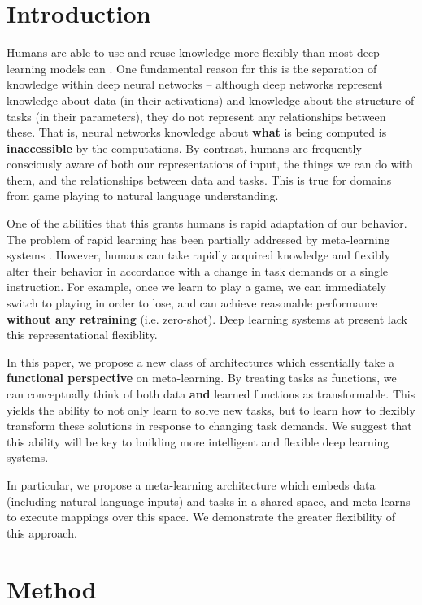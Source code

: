 \documentclass[11pt]{article}
\begin{document}
\section{Introduction}
Humans are able to use and reuse knowledge more flexibly than most deep learning models can \citep{Lake2017}. One fundamental reason for this is the separation of knowledge within deep neural networks -- although deep networks represent knowledge about data (in their activations) and knowledge about the structure of tasks (in their parameters), they do not represent any relationships between these. That is, neural networks knowledge about \textbf{what} is being computed is \textbf{inaccessible} by the computations. By contrast, humans are frequently consciously aware of both our representations of input, the things we can do with them, and the relationships between data and tasks. This is true for domains from game playing to natural language understanding. \par
One of the abilities that this grants humans is rapid adaptation of our behavior. The problem of rapid learning has been partially addressed by meta-learning systems \citep{}. However, humans can take rapidly acquired knowledge and flexibly alter their behavior in accordance with a change in task demands or a single instruction. For example, once we learn to play a game, we can immediately switch to playing in order to lose, and can achieve reasonable performance \textbf{without any retraining} (i.e. zero-shot). Deep learning systems at present lack this representational flexiblity. \par
In this paper, we propose a new class of architectures which essentially take a \textbf{functional perspective} on meta-learning. By treating tasks as functions, we can conceptually think of both data \textbf{and} learned functions as transformable. This yields the ability to not only learn to solve new tasks, but to learn how to flexibly transform these solutions in response to changing task demands. We suggest that this ability will be key to building more intelligent and flexible deep learning systems. \par
In particular, we propose a meta-learning architecture which embeds data (including natural language inputs) and tasks in a shared space, and meta-learns to execute mappings over this space. We demonstrate the greater flexibility of this approach.
\section{Method}
\end{document}
